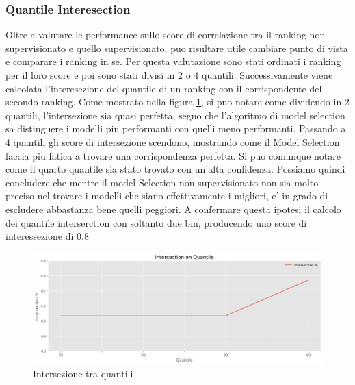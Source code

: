 \subsubsection{Quantile Interesection}
Oltre a valutare le performance sullo score di correlazione tra il ranking non supervisionato e quello supervisionato, puo risultare utile cambiare punto di vista e comparare i ranking in se.
Per questa valutazione sono stati ordinati i ranking per il loro score e poi sono stati divisi in 2 o 4 quantili. Successivamente viene calcolata l'interesezione del quantile di un ranking con il corrispondente del secondo ranking.
Come mostrato nella figura \ref{quantile-intersection}, si puo notare come dividendo in 2 quantili, l'intersezione sia quasi perfetta, segno che l'algoritmo di model selection sa distinguere i modelli piu performanti con quelli meno performanti.
Passando a 4 quantili gli score di intersezione scendono, mostrando come il Model Selection faccia piu fatica a trovare una corrispondenza perfetta. Si puo comunque notare come il quarto quantile sia stato trovato con un'alta confidenza.
Possiamo quindi concludere che mentre il model Selection non supervisionato non sia molto preciso nel trovare i modelli che siano effettivamente i migliori, e' in grado di escludere abbastanza bene quelli peggiori. A confermare questa ipotesi il calcolo dei quantile interserction con soltanto due bin, producendo uno score di interessezione di \(0.8\)

\begin{figure}[t]
\centering
	\includegraphics[width=14cm, scale=1]{images/4quantile}
    \caption{Intersezione tra quantili}
	\label{quantile-intersection}
	
\end{figure}


\newpage
